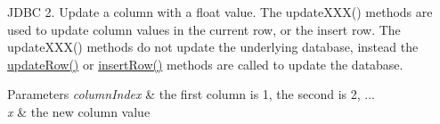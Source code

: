 J\+D\+BC 2. Update a column with a float value. The update\+X\+X\+X() methods are used to update column values in the current row, or the insert row. The update\+X\+X\+X() methods do not update the underlying database, instead the \mbox{\hyperlink{classcom_1_1mysql_1_1jdbc_1_1_updatable_result_set_a919969ba4b3c7cbc7b18605e9f31a746}{update\+Row()}} or \mbox{\hyperlink{classcom_1_1mysql_1_1jdbc_1_1_updatable_result_set_aef041f8d9d0778083716fc26652648fa}{insert\+Row()}} methods are called to update the database.


\begin{DoxyParams}{Parameters}
{\em column\+Index} & the first column is 1, the second is 2, ... \\
\hline
{\em x} & the new column value\\
\hline
\end{DoxyParams}

